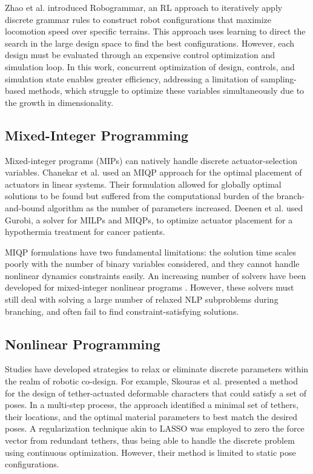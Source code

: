 
Zhao et al. \cite{Zhao2020} introduced Robogrammar, an RL approach to iteratively apply discrete grammar rules to construct robot configurations that maximize locomotion speed over specific terrains. This approach uses learning to direct the search in the large design space to find the best configurations. However, each design must be evaluated through an expensive control optimization and simulation loop. In this work, concurrent optimization of design, controls, and simulation state enables greater efficiency, addressing a limitation of sampling-based methods, which struggle to optimize these variables simultaneously due to the growth in dimensionality.
\subsection{Mixed-Integer Programming}
Mixed-integer programs (MIPs) can natively handle discrete actuator-selection variables. Chanekar et al. \cite{Chanekar2017} used an MIQP approach for the optimal placement of actuators in linear systems. Their formulation allowed for globally optimal solutions to be found but suffered from the computational burden of the branch-and-bound algorithm as the number of parameters increased. Deenen et al. \cite{Deenen2023} used Gurobi, a solver for MILPs and MIQPs, to optimize actuator placement for a hypothermia treatment for cancer patients.

MIQP formulations have two fundamental limitations: the solution time scales poorly with the number of binary variables considered, and they cannot handle nonlinear dynamics constraints easily. An increasing number of solvers have been developed for mixed-integer nonlinear programs \cite{kronqvist2019review, juniper, alpine_JOGO2019}. However, these solvers must still deal with solving a large number of relaxed NLP subproblems during branching, and often fail to find constraint-satisfying solutions. 

\subsection{Nonlinear Programming}
Studies have developed strategies to relax or eliminate discrete parameters within the realm of robotic co-design. For example, Skouras et al. \cite{Skouras2013} presented a method for the design of tether-actuated deformable characters that could satisfy a set of poses. In a multi-step process, the approach identified a minimal set of tethers, their locations, and the optimal material parameters to best match the desired poses. A regularization technique akin to LASSO was employed to zero the force vector from redundant tethers, thus being able to handle the discrete problem using continuous optimization. However, their method is limited to static pose configurations. 

